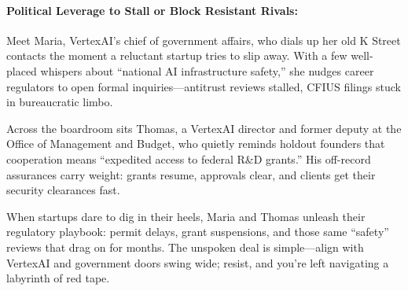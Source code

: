\medskip


\paragraph{Political Leverage to Stall or Block Resistant Rivals:} 
Meet Maria, VertexAI’s chief of government affairs, who dials up her old K Street contacts the moment a reluctant startup 
tries to slip away. With a few well-placed whispers about “national AI infrastructure safety,” she nudges career 
regulators to open formal inquiries—antitrust reviews stalled, CFIUS filings stuck in bureaucratic limbo.

Across the boardroom sits Thomas, a VertexAI director and former deputy at the Office of Management and Budget, who 
quietly reminds holdout founders that cooperation means “expedited access to federal R\&D grants.” His off-record 
assurances carry weight: grants resume, approvals clear, and clients get their security clearances fast.

When startups dare to dig in their heels, Maria and Thomas unleash their regulatory playbook: permit delays, grant 
suspensions, and those same “safety” reviews that drag on for months. The unspoken deal is simple—align with VertexAI 
and government doors swing wide; resist, and you’re left navigating a labyrinth of red tape.

\medskip

